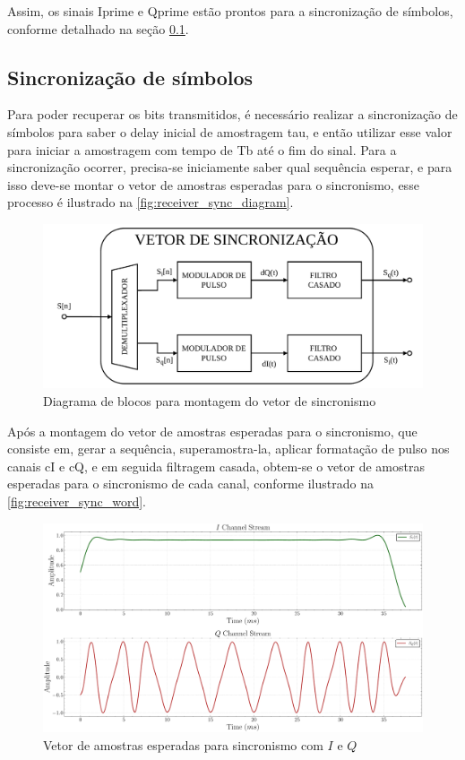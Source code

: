 Assim, os sinais \gls{Iprime} e \gls{Qprime} estão prontos para a sincronização de símbolos, conforme detalhado na seção \ref{sec:sincronizacao}.

\subsection{Sincronização de símbolos}\label{sec:sincronizacao}

Para poder recuperar os bits transmitidos, é necessário realizar a sincronização de símbolos para saber o delay inicial de amostragem \gls{tau}, e então utilizar esse valor para iniciar a amostragem com tempo de \gls{Tb} até o fim do sinal. Para a sincronização ocorrer, precisa-se iniciamente saber qual sequência esperar, e para isso deve-se montar o vetor de amostras esperadas para o sincronismo, esse processo é ilustrado na \autoref{fig:receiver_sync_diagram}.

\begin{figure}[H]
	\centering
	\caption{Diagrama de blocos para montagem do vetor de sincronismo}\label{fig:receiver_sync_diagram}
	\includegraphics[width=\linewidth]{assets/diagrams/sync.pdf}
\end{figure}

Após a montagem do vetor de amostras esperadas para o sincronismo, que consiste em, gerar a sequência, superamostra-la, aplicar formatação de pulso nos canais \gls{cI} e \gls{cQ}, e em seguida filtragem casada, obtem-se o vetor de amostras esperadas para o sincronismo de cada canal, conforme ilustrado na \autoref{fig:receiver_sync_word}.

\begin{figure}[H]
	\centering
	\caption{Vetor de amostras esperadas para sincronismo com $I$ e $Q$}\label{fig:receiver_sync_word}
	\includegraphics[width=\linewidth]{assets/cap3/example_synchronizer_word.pdf}
\end{figure}

